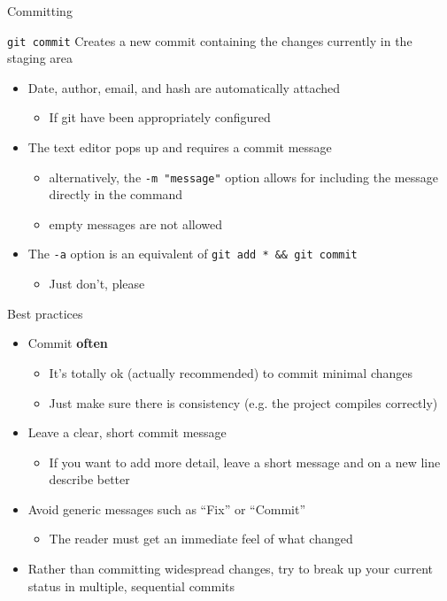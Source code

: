 \documentclass[presentation]{beamer}
\begin{document}
\begin{frame}[allowframebreaks]{Committing}
    \begin{block}{\texttt{git commit}}
        Creates a new commit containing the changes currently in the staging area
        \begin{itemize}
            \item Date, author, email, and hash are automatically attached
            \begin{itemize}
                \item If git have been appropriately configured
            \end{itemize}
            \item The text editor pops up and requires a commit message
            \begin{itemize}
                \item alternatively, the \texttt{-m "message"} option allows for including the message directly in the command
                \item empty messages are not allowed
            \end{itemize}
            \item The \texttt{-a} option is an equivalent of \texttt{git add * \&\& git commit}
            \begin{itemize}
                \item Just don't, please
            \end{itemize}
        \end{itemize}
    \end{block}
    \begin{block}{Best practices}
        \begin{itemize}
            \item Commit \textbf{often}
            \begin{itemize}
                \item It's totally ok (actually recommended) to commit minimal changes
                \item Just make sure there is consistency (e.g. the project compiles correctly)
            \end{itemize}
            \item Leave a clear, short commit message
            \begin{itemize}
                \item If you want to add more detail, leave a short message and on a new line describe better
            \end{itemize}
            \item Avoid generic messages such as ``Fix'' or ``Commit''
            \begin{itemize}
                \item The reader must get an immediate feel of what changed
            \end{itemize}
            \item Rather than committing widespread changes, try to break up your current status in multiple, sequential commits
        \end{itemize}
    \end{block}
\end{frame}
\end{document}
